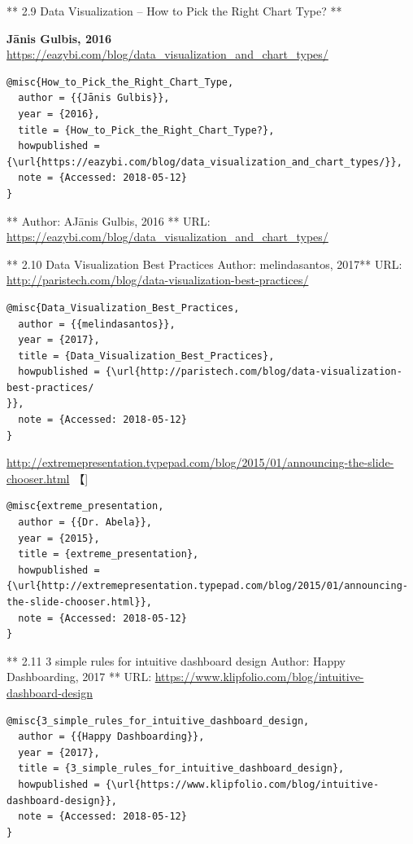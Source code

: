 \documentclass[]{book}
\theoremstyle{definition}
\theoremstyle{definition}
\theoremstyle{definition}
\theoremstyle{remark}
\begin{document}
** 2.9 Data Visualization -- How to Pick the Right Chart Type? **

\textbf{Jānis Gulbis, 2016}
\url{https://eazybi.com/blog/data_visualization_and_chart_types/}
\citep{How_to_Pick_the_Right_Chart_Type}

\begin{verbatim}
@misc{How_to_Pick_the_Right_Chart_Type,
  author = {{Jānis Gulbis}},
  year = {2016},
  title = {How_to_Pick_the_Right_Chart_Type?},
  howpublished = {\url{https://eazybi.com/blog/data_visualization_and_chart_types/}},
  note = {Accessed: 2018-05-12}
}
\end{verbatim}

** Author: AJānis Gulbis, 2016 ** URL:
\url{https://eazybi.com/blog/data_visualization_and_chart_types/}

** 2.10 Data Visualization Best Practices\textbf{ } Author:
melindasantos, 2017** URL:
\url{http://paristech.com/blog/data-visualization-best-practices/}
\citep{Data_Visualization_Best_Practices}

\begin{verbatim}
@misc{Data_Visualization_Best_Practices,
  author = {{melindasantos}},
  year = {2017},
  title = {Data_Visualization_Best_Practices},
  howpublished = {\url{http://paristech.com/blog/data-visualization-best-practices/
}},
  note = {Accessed: 2018-05-12}
}
\end{verbatim}

\url{http://extremepresentation.typepad.com/blog/2015/01/announcing-the-slide-chooser.html}
【\citet{extreme_presentation}{]}

\begin{verbatim}
@misc{extreme_presentation,
  author = {{Dr. Abela}},
  year = {2015},
  title = {extreme_presentation},
  howpublished = {\url{http://extremepresentation.typepad.com/blog/2015/01/announcing-the-slide-chooser.html}},
  note = {Accessed: 2018-05-12}
}
\end{verbatim}

** 2.11 3 simple rules for intuitive dashboard design\textbf{ } Author:
Happy Dashboarding, 2017 ** URL:
\url{https://www.klipfolio.com/blog/intuitive-dashboard-design}
\citep{3_simple_rules_for_intuitive_dashboard_design}

\begin{verbatim}
@misc{3_simple_rules_for_intuitive_dashboard_design,
  author = {{Happy Dashboarding}},
  year = {2017},
  title = {3_simple_rules_for_intuitive_dashboard_design},
  howpublished = {\url{https://www.klipfolio.com/blog/intuitive-dashboard-design}},
  note = {Accessed: 2018-05-12}
}
\end{verbatim}
\end{document}
